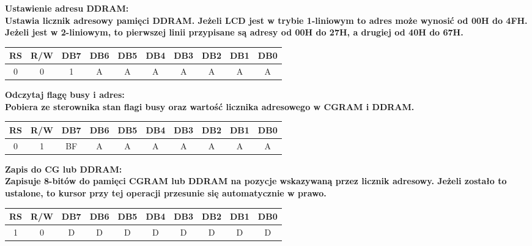\documentclass[a4paper,12pt]{article}
\newcommand{\h}[1]{\noindent \bf #1 \rm \\ \noindent}
\begin{document}
\h{Ustawienie adresu DDRAM:}
Ustawia licznik adresowy pamięci DDRAM. Jeżeli LCD jest w trybie 1-liniowym to adres może wynosić od 00H do 4FH. Jeżeli jest  w 2-liniowym, to pierwszej linii przypisane są adresy od 00H do 27H, a drugiej od 40H do 67H.
\begin{table}[H]
	\centering
	\begin{tabular}{|c|c|c|c|c|c|c|c|c|c|}
		\hline
		\textbf{RS} & \textbf{R/W} & \textbf{DB7} & \textbf{DB6} & \textbf{DB5} & \textbf{DB4} & \textbf{DB3} & \textbf{DB2} & \textbf{DB1} & \textbf{DB0} \\ \hline
		0           & 0            & 1            & A            & A            & A            & A            & A            & A            & A            \\ \hline
	\end{tabular}
\end{table}

\h{Odczytaj flagę busy i adres:}
Pobiera ze sterownika stan flagi busy oraz wartość licznika adresowego w CGRAM i DDRAM.
\begin{table}[H]
	\begin{tabular}{|c|c|c|c|c|c|c|c|c|c|}
		\hline
		\textbf{RS} & \textbf{R/W} & \textbf{DB7} & \textbf{DB6} & \textbf{DB5} & \textbf{DB4} & \textbf{DB3} & \textbf{DB2} & \textbf{DB1} & \textbf{DB0} \\ \hline
		0           & 1            & BF           & A            & A            & A            & A            & A            & A            & A            \\ \hline
	\end{tabular}
\end{table}

\h{Zapis do CG lub DDRAM:}
Zapisuje 8-bitów do pamięci CGRAM lub DDRAM na pozycje wskazywaną przez licznik adresowy. Jeżeli zostało to ustalone, to kursor przy tej operacji przesunie się automatycznie w prawo.
\begin{table}[H]
	\centering
	\begin{tabular}{|c|c|c|c|c|c|c|c|c|c|}
		\hline
		\textbf{RS} & \textbf{R/W} & \textbf{DB7} & \textbf{DB6} & \textbf{DB5} & \textbf{DB4} & \textbf{DB3} & \textbf{DB2} & \textbf{DB1} & \textbf{DB0} \\ \hline
		1           & 0            & D            & D            & D            & D            & D            & D            & D            & D            \\ \hline
	\end{tabular}
\end{table}
\end{document}
